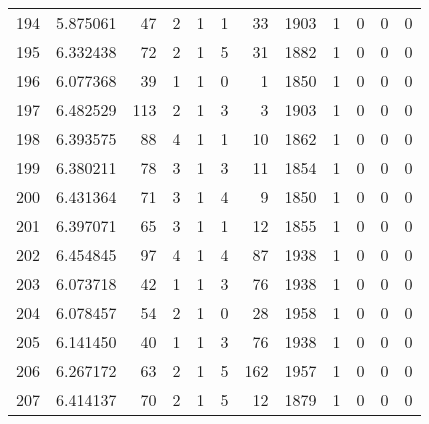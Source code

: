 \begin{tabular}{lrrrrrrrrrrr}
194 &  5.875061 &   47 &      2 &        1 &      1 &              33 &  1903 &               1 &               0 &               0 &               0 \\
195 &  6.332438 &   72 &      2 &        1 &      5 &              31 &  1882 &               1 &               0 &               0 &               0 \\
196 &  6.077368 &   39 &      1 &        1 &      0 &               1 &  1850 &               1 &               0 &               0 &               0 \\
197 &  6.482529 &  113 &      2 &        1 &      3 &               3 &  1903 &               1 &               0 &               0 &               0 \\
198 &  6.393575 &   88 &      4 &        1 &      1 &              10 &  1862 &               1 &               0 &               0 &               0 \\
199 &  6.380211 &   78 &      3 &        1 &      3 &              11 &  1854 &               1 &               0 &               0 &               0 \\
200 &  6.431364 &   71 &      3 &        1 &      4 &               9 &  1850 &               1 &               0 &               0 &               0 \\
201 &  6.397071 &   65 &      3 &        1 &      1 &              12 &  1855 &               1 &               0 &               0 &               0 \\
202 &  6.454845 &   97 &      4 &        1 &      4 &              87 &  1938 &               1 &               0 &               0 &               0 \\
203 &  6.073718 &   42 &      1 &        1 &      3 &              76 &  1938 &               1 &               0 &               0 &               0 \\
204 &  6.078457 &   54 &      2 &        1 &      0 &              28 &  1958 &               1 &               0 &               0 &               0 \\
205 &  6.141450 &   40 &      1 &        1 &      3 &              76 &  1938 &               1 &               0 &               0 &               0 \\
206 &  6.267172 &   63 &      2 &        1 &      5 &             162 &  1957 &               1 &               0 &               0 &               0 \\
207 &  6.414137 &   70 &      2 &        1 &      5 &              12 &  1879 &               1 &               0 &               0 &               0 \\

\end{tabular}
